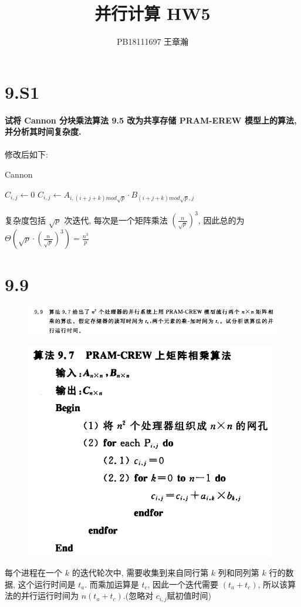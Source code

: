 \documentclass[UTF8]{article}
\title{并行计算 HW5}
\author{PB18111697 王章瀚}
\newcommand{\jumpLine} {\hspace*{\fill} \\}
\begin{document}
\maketitle
\section*{9.S1}
\noindent \textbf{试将 Cannon 分块乘法算法 9.5 改为共享存储 PRAM-EREW 模型上的算法, 并分析其时间复杂度.} \\\jumpLine\noindent
修改后如下:
\begin{algorithm}[H]
	\caption{{\sc Cannon}}
	\begin{algorithmic}[1]
			\State $C_{i,j} \leftarrow 0$
				\State $C_{i,j} \leftarrow A_{i, (i+j+k) mod \sqrt{p}}\cdot B_{(i+j+k) mod \sqrt{p}, j}$
			\EndFor
		\EndFor
	\end{algorithmic}
\end{algorithm}
\noindent 复杂度包括 $\sqrt{p}$ 次迭代, 每次是一个矩阵乘法 $(\frac{n}{\sqrt{p}})^3$, 因此总的为 $\Theta(\sqrt{p}\cdot(\frac{n}{\sqrt{p}})^3)=\frac{n^3}{p}$

\section*{9.9}
\begin{figure}[H]
	\centering
	\includegraphics[width=\linewidth*4/5]{image/9.9.png}
\end{figure}\par
\begin{figure}[H]
	\centering
	\includegraphics[width=\linewidth/3]{image/9.9.alg.png}
\end{figure}\par
\noindent 每个进程在一个 $k$ 的迭代轮次中, 需要收集到来自同行第 $k$ 列和同列第 $k$ 行的数据, 这个运行时间是 $t_a$. 而乘加运算是 $t_c$, 因此一个迭代需要 $(t_a + t_c)$, 所以该算法的并行运行时间为 $n(t_a + t_c)$.(忽略对 $c_{i,j}$赋初值时间)
\end{document}
